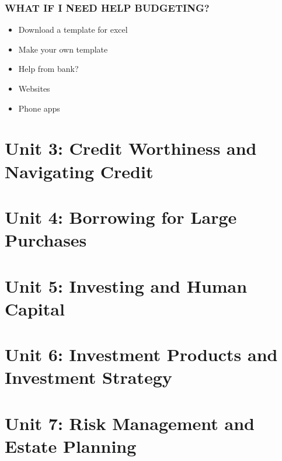 \documentclass[12pt]{article}
\begin{document}
            \subsubsection{WHAT IF I NEED HELP BUDGETING?}
                \begin{itemize}
                    \item Download a template for excel
                    \item Make your own template
                    \item Help from bank?
                    \item Websites
                    \item Phone apps
                \end{itemize}

    \section {Unit 3: Credit Worthiness and Navigating Credit}

    \section{Unit 4: Borrowing for Large Purchases}

    \section{Unit 5: Investing and Human Capital}
    
    \section{Unit 6: Investment Products and Investment Strategy}

    \section{Unit 7: Risk Management and Estate Planning}
    
\end{document}
